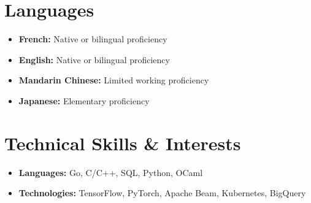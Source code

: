 \documentclass[letterpaper,11pt]{article}
\newcommand{\resumeItem}[1]{
  \item\small{#1 \vspace{-2pt}}
}
\newcommand{\resumeSubHeadingListStart}{\begin{itemize}[leftmargin=*]}
\newcommand{\resumeSubHeadingListEnd}{\end{itemize}}
\begin{document}
\section{Languages}
\resumeSubHeadingListStart{}
\resumeItem{
	\textbf{French:}{
		Native or bilingual proficiency
	}
}
\resumeItem{
	\textbf{English:}{
		Native or bilingual proficiency
	}
}
\resumeItem{
	\textbf{Mandarin Chinese:}{
		Limited working proficiency
	}
}
\resumeItem{
	\textbf{Japanese:}{
		Elementary proficiency
	}
}
\resumeSubHeadingListEnd{}


\section{Technical Skills \& Interests}
\resumeSubHeadingListStart{}
\resumeItem{
	\textbf{Languages:}{
		Go, C/C++, SQL, Python, OCaml
	}
}
\resumeItem{
	\textbf{Technologies:}{
		TensorFlow, PyTorch, Apache Beam, Kubernetes, BigQuery
	}
}
\resumeSubHeadingListEnd{}
\end{document}
